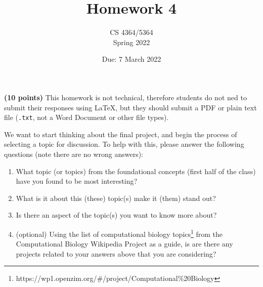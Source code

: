 \documentclass[11pt, oneside]{article}   	%
\title{Homework 4}
\author{CS 4364/5364\\Spring 2022}
\date{Due: 7 March 2022}							%
\begin{document}
\maketitle

\textbf{(10 points)} This homework is not technical, therefore students do not ned to submit their responses using \LaTeX, 
but they should submit a PDF or plain text file (\texttt{.txt}, not a Word Document or other file types). 

We want to start thinking about the final project, and begin the process of selecting a topic for discussion.
To help with this, please answer the following questions (note there are no wrong answers):

\begin{enumerate}
\item What topic (or topics) from the foundational concepts (first half of the class) have you found to be most interesting? 

\item What is it about this (these) topic(s) make it (them) stand out? 

\item Is there an aspect of the topic(s) you want to know more about? 

\item (optional) Using the list of computational biology topics\footnote{https://wp1.openzim.org/\#/project/Computational\%20Biology} from the Computational Biology Wikipedia Project as a guide, 
is are there any projects related to your answers above that you are considering? 

\end{enumerate}
\end{document}
